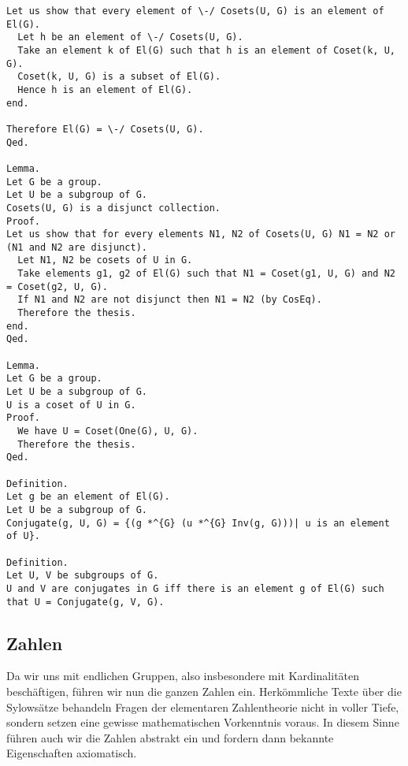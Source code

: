 \documentclass[a4paper,12pt]{scrartcl}
\begin{document}
\begin{lstlisting}
Let us show that every element of \-/ Cosets(U, G) is an element of El(G).
  Let h be an element of \-/ Cosets(U, G).
  Take an element k of El(G) such that h is an element of Coset(k, U, G).
  Coset(k, U, G) is a subset of El(G).
  Hence h is an element of El(G).
end.

Therefore El(G) = \-/ Cosets(U, G).
Qed.

Lemma.
Let G be a group.
Let U be a subgroup of G.
Cosets(U, G) is a disjunct collection.
Proof.
Let us show that for every elements N1, N2 of Cosets(U, G) N1 = N2 or (N1 and N2 are disjunct).
  Let N1, N2 be cosets of U in G.
  Take elements g1, g2 of El(G) such that N1 = Coset(g1, U, G) and N2 = Coset(g2, U, G).
  If N1 and N2 are not disjunct then N1 = N2 (by CosEq).
  Therefore the thesis.
end.
Qed.

Lemma.
Let G be a group.
Let U be a subgroup of G.
U is a coset of U in G.
Proof.
  We have U = Coset(One(G), U, G).
  Therefore the thesis.
Qed.

Definition.
Let g be an element of El(G).
Let U be a subgroup of G.
Conjugate(g, U, G) = {(g *^{G} (u *^{G} Inv(g, G)))| u is an element of U}.

Definition.
Let U, V be subgroups of G.
U and V are conjugates in G iff there is an element g of El(G) such that U = Conjugate(g, V, G).

\end{lstlisting}

\subsection{Zahlen}

Da wir uns mit endlichen Gruppen, also insbesondere mit Kardinalitäten beschäftigen, führen wir nun die ganzen Zahlen ein. 
Herkömmliche Texte über die Sylowsätze \cite{bibtex.a} behandeln Fragen der elementaren Zahlentheorie nicht in voller Tiefe, sondern setzen eine gewisse mathematischen Vorkenntnis voraus.
In diesem Sinne führen auch wir die Zahlen abstrakt ein und fordern dann bekannte Eigenschaften axiomatisch.
\end{document}

